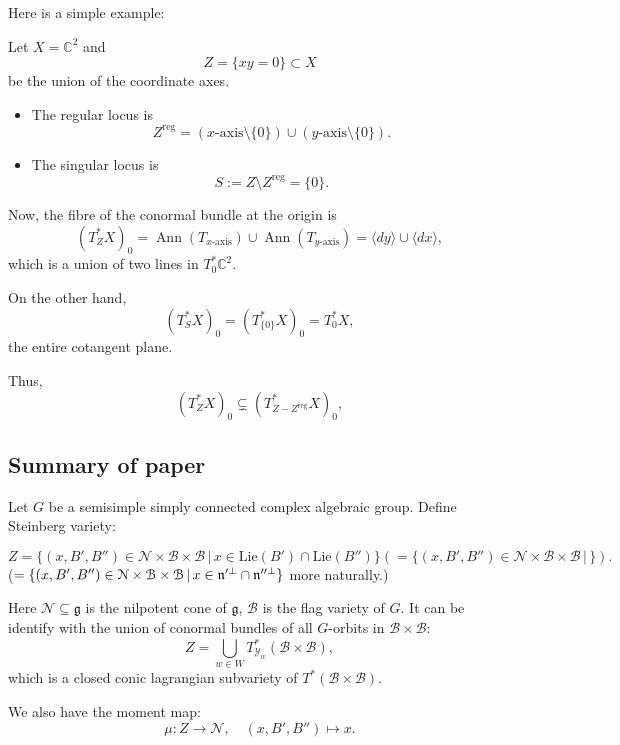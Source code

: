 \documentclass[12pt]{amsart}
\numberwithin{equation}{section}
\newcommand{\CN}{{\mathcal {N}}} \newcommand{\CO}{{\mathcal {O}}} \newcommand{\CP}{{\mathcal {P}}}
\newcommand{\fg}{\mathfrak{g}} \newcommand{\fh}{\mathfrak{h}} \newcommand{\fk}{\mathfrak{k}}
\newcommand{\set}[2]{\{#1\,|\,#2\}}
\begin{document}
Here is a simple example:
\begin{examp}Let \(X = \mathbb{C}^2\) and 
\[
Z = \{ xy = 0 \} \subset X
\] 
be the union of the coordinate axes. 

\begin{itemize}
    \item The regular locus is
    \[
    Z^{\mathrm{reg}} = (x\text{-axis} \setminus \{0\}) \cup (y\text{-axis} \setminus \{0\}).
    \]
    \item The singular locus is
    \[
    S := Z \setminus Z^{\mathrm{reg}} = \{0\}.
    \]
\end{itemize}

Now, the fibre of the conormal bundle at the origin is
\[
(T^*_Z X)_0 = \operatorname{Ann}(T_{x\text{-axis}}) \cup \operatorname{Ann}(T_{y\text{-axis}}) = \langle dy \rangle \cup \langle dx \rangle,
\]
which is a union of two lines in \(T^*_0 \mathbb{C}^2\). 

On the other hand,
\[
(T^*_{S} X)_0 = (T^*_{\{0\}} X)_0 = T^*_0 X,
\]
the entire cotangent plane. 

Thus,
\[
(T^*_Z X)_0 \subsetneq (T^*_{Z - Z^{\mathrm{reg}}} X)_0,
\]

\end{examp}


\subsection{Summary of paper \cite[The characteristic cycles of holonomic systems on a flag manifold]{KT84}}


Let $G$ be a semisimple simply connected complex algebraic group. Define Steinberg variety:

\[
    Z = \set{(x,B',B'') \in \mathcal{N} \times \mathcal{B} \times \mathcal{B}}{x \in \mathrm{Lie}(B') \cap \mathrm{Lie}(B'')} (= \set{(x,B',B'') \in \mathcal{N} \times \mathcal{B} \times \mathcal{B}}{}).
\]
($= \set{(x,B',B'') \in \mathcal{N} \times \mathcal{B} \times \mathcal{B}}{x \in \fn'^{\perp} \cap \fn''^{\perp}}$ more naturally.)

Here $\mathcal{N} \subseteq \fg$ is the nilpotent cone of $\fg$, $\mathcal{B}$ is the flag variety of $G$.
It can be identify with the union of conormal bundles of all $G$-orbits in $\mathcal{B} \times \mathcal{B}$:
\[Z = \bigcup_{w \in W} T^*_{\mathcal{Y}_w}(\mathcal{B} \times \mathcal{B}),\]
which is a closed conic lagrangian subvariety of $T^*(\mathcal{B} \times \mathcal{B})$.

We also have the moment map:
\[\mu : Z \to \CN, \quad (x,B',B'') \mapsto x.\]
\end{document}

